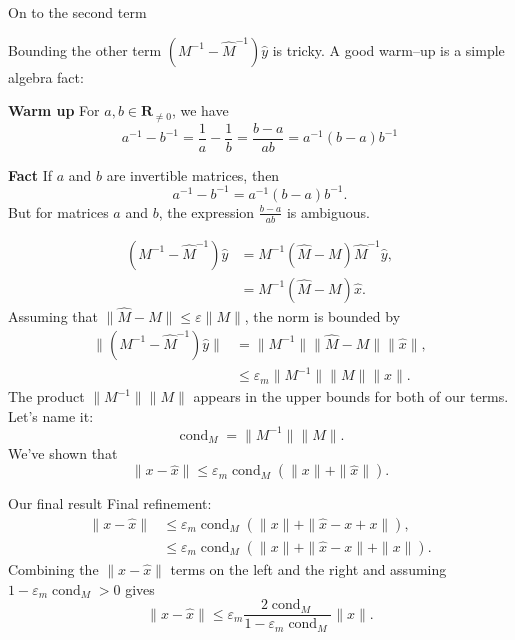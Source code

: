 \documentclass[usenames,dvipsnames,fleqn]{beamer}
\newcommand{\reals}{\mathbf{R}}
\DeclareMathOperator{\cond}{cond}
\theoremstyle{definition}
\begin{document}
\begin{frame}{On to the second term}

Bounding the other term \( \left(M^{-1} - \widehat M^{-1} \right) \widehat y \) is tricky. A good warm--up 
is a simple algebra fact:

\textbf{Warm up}  For \(a,b \in \reals_{\neq 0}\), we have
\[
   a^{-1} - b^{-1} = \frac{1}{a} - \frac{1}{b} = \frac{b-a}{a b} = a^{-1} (b - a) b^{-1}
\]


\textbf{Fact} If \(a\) and \(b\) are invertible matrices, then
\[
    a^{-1} - b^{-1} = a^{-1} (b - a) b^{-1}.
\]
But for matrices \(a\) and \(b\), the expression  \(\frac{b-a}{a b}\) is ambiguous.


\end{frame}
\begin{frame}
 \begin{align*}
    \left(M^{-1} - \widehat M^{-1} \right) \widehat y &= M^{-1} (\widehat M - M) \widehat M^{-1} \widehat y, \\
    &=   M^{-1} (\widehat M - M) \widehat x.
 \end{align*}
 Assuming that $ \|  \widehat M - M \| \leq \varepsilon \|M \|$, the norm is bounded by
 \begin{align*}
  \| \left(M^{-1} - \widehat M^{-1} \right) \widehat y \| &= \| M^{-1} \| 
     \|  \widehat M - M \| \|\widehat x \|, \\
     &\leq  \varepsilon_m  \| M^{-1} \|  \| M \|  \|\widehat x \|.
 \end{align*} 
 The product  \(\| M^{-1} \|  \| M \| \) appears in the upper bounds for both of our terms. Let's name it:
 \[
    \cond_M = \| M^{-1} \|  \| M \|.
 \]
 We've shown that 
 \[
    \| x - \widehat x \| \leq \varepsilon_m \cond_M \left (\| x \| + \| \widehat x \| \right).
 \]
\end{frame}
\begin{frame}{Our final result}
Final refinement:
\begin{align*} 
    \| x - \widehat x \| & \leq \varepsilon_m \cond_M \left (\| x \| + \| \widehat x - x + x \| \right), \\
                &\leq  \varepsilon_m \cond_M \left (\| x \| + \| \widehat x - x  \| + \| x \| \right).
 \end{align*}
 Combining the \(\| x - \widehat x \| \) terms on the left and the right and assuming 
 \(1 - \varepsilon_m \cond_M   > 0 \) gives
 \[
     \| x - \widehat x \| \leq \varepsilon_m \frac{2 \cond_M}{1 - \varepsilon_m \cond_M } \| x \| .
 \]
\end{frame}
\end{document}
